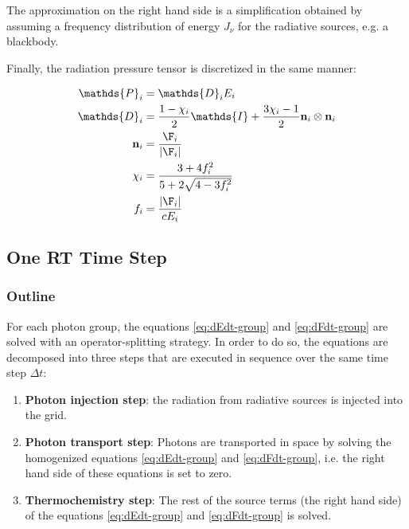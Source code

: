 The approximation on the right hand side is a simplification obtained by assuming 
a frequency distribution of energy $J_{\nu}$ for the radiative sources, e.g. a blackbody.

Finally, the radiation pressure tensor is discretized in the same manner:

\begin{align}
	\mathds{P}_i &= 
        \mathds{D}_i E_i \label{eq:pressure-tensor-group-start}\\
	\mathds{D}_i &= 
        \frac{1- \chi_i}{2} \mathds{I} + \frac{3 \chi_i - 1}{2} \mathbf{n}_i \otimes \mathbf{n}_i \label{eq:eddington-group} \\
	\mathbf{n}_i &= 
        \frac{\F_i}{|\F_i|} \\
	\chi_i &= 
        \frac{3 + 4 f_i ^2}{5 + 2 \sqrt{4 - 3 f_i^2}} \\
	f_i &= 
        \frac{|\F_i|}{c E_i} \label{eq:pressure-tensor-group-end}
\end{align}













\subsection{One RT Time Step}



\subsubsection{Outline}


For each photon group, the equations \ref{eq:dEdt-group} and \ref{eq:dFdt-group} are solved with an operator-splitting strategy.
In order to do so, the equations are decomposed into three steps that are executed in sequence over the same time step $\Delta t$:

\begin{enumerate}

\item \textbf{Photon injection step}: the radiation from radiative sources is injected into the grid.

\item \textbf{Photon transport step}: Photons are transported in space by solving the homogenized equations \ref{eq:dEdt-group} and \ref{eq:dFdt-group}, i.e. the right hand side of these equations is set to zero.

\item \textbf{Thermochemistry step}: The rest of the source terms (the right hand side) of the equations \ref{eq:dEdt-group} and \ref{eq:dFdt-group} is solved.
\end{enumerate}






